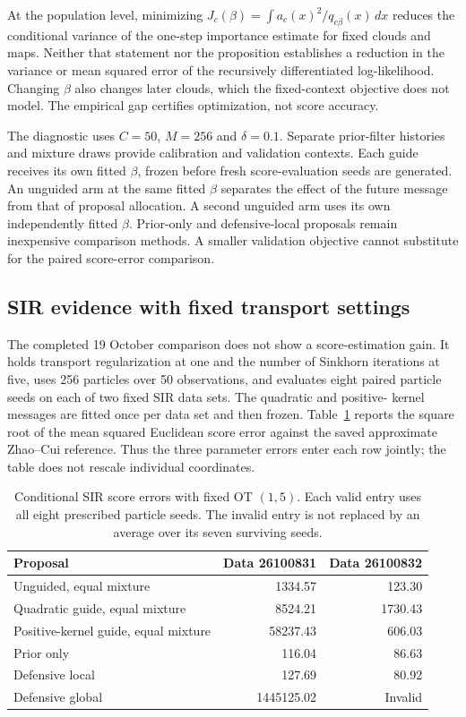 At the population level, minimizing
$J_c(\beta)=\int a_c(x)^2/q_{c\beta}(x)\,dx$ reduces the conditional
variance of the one-step importance estimate for fixed clouds and maps.
Neither that statement nor the proposition establishes a reduction in the
variance or mean squared error of the recursively differentiated log-likelihood.
Changing $\beta$ also changes later clouds, which the fixed-context objective
does not model. The empirical gap certifies optimization, not score accuracy.

The diagnostic uses $C=50$, $M=256$ and $\delta=0.1$. Separate prior-filter
histories and mixture draws provide calibration and validation contexts. Each
guide receives its own fitted $\beta$, frozen before fresh score-evaluation
seeds are generated. An unguided arm at the same fitted $\beta$ separates
the effect of the future message from that of proposal allocation. A second
unguided arm uses its own independently fitted $\beta$. Prior-only and
defensive-local proposals remain inexpensive comparison methods. A smaller
validation objective cannot substitute for the paired score-error comparison.

\subsection{SIR evidence with fixed transport settings}
\label{sec:bg-sir-fixed-transport-results}

The completed 19 October comparison does not show a score-estimation gain.
It holds transport regularization at one and the number of Sinkhorn iterations
at five, uses 256 particles over 50 observations, and evaluates eight paired
particle seeds on each of two fixed SIR data sets. The quadratic and positive-
kernel messages are fitted once per data set and then frozen. Table~\ref{tab:bg-sir-first-results}
reports the square root of the mean squared Euclidean score error against the
saved approximate Zhao--Cui reference. Thus the three parameter errors enter
each row jointly; the table does not rescale individual coordinates.

\begin{table}[htbp]
\centering
\begin{tabular}{lrr}
\hline
Proposal & Data 26100831 & Data 26100832 \\
\hline
Unguided, equal mixture & 1334.57 & 123.30 \\
Quadratic guide, equal mixture & 8524.21 & 1730.43 \\
Positive-kernel guide, equal mixture & 58237.43 & 606.03 \\
Prior only & 116.04 & 86.63 \\
Defensive local & 127.69 & 80.92 \\
Defensive global & 1445125.02 & Invalid \\
\hline
\end{tabular}
\caption{Conditional SIR score errors with fixed OT $(1,5)$. Each valid
entry uses all eight prescribed particle seeds. The invalid entry is not
replaced by an average over its seven surviving seeds.}
\label{tab:bg-sir-first-results}
\end{table}

